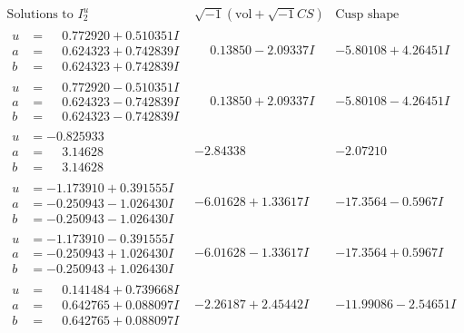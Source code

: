 \documentclass[1p]{elsarticle_modified}
\theoremstyle{definition}
\newcommand{\I}{\sqrt{-1}}
\begin{document}
$$\begin{array}{c|c|c}  
\text{Solutions to }I^u_{2}& \I (\text{vol} + \sqrt{-1}CS) & \text{Cusp shape}\\
 \hline 
\begin{aligned}
u &= \phantom{-}0.772920 + 0.510351 I \\
a &= \phantom{-}0.624323 + 0.742839 I \\
b &= \phantom{-}0.624323 + 0.742839 I\end{aligned}
 & \phantom{-}0.13850 - 2.09337 I & -5.80108 + 4.26451 I \\ \hline\begin{aligned}
u &= \phantom{-}0.772920 - 0.510351 I \\
a &= \phantom{-}0.624323 - 0.742839 I \\
b &= \phantom{-}0.624323 - 0.742839 I\end{aligned}
 & \phantom{-}0.13850 + 2.09337 I & -5.80108 - 4.26451 I \\ \hline\begin{aligned}
u &= -0.825933\phantom{ +0.000000I} \\
a &= \phantom{-}3.14628\phantom{ +0.000000I} \\
b &= \phantom{-}3.14628\phantom{ +0.000000I}\end{aligned}
 & -2.84338\phantom{ +0.000000I} & -2.07210\phantom{ +0.000000I} \\ \hline\begin{aligned}
u &= -1.173910 + 0.391555 I \\
a &= -0.250943 - 1.026430 I \\
b &= -0.250943 - 1.026430 I\end{aligned}
 & -6.01628 + 1.33617 I & -17.3564 - 0.5967 I \\ \hline\begin{aligned}
u &= -1.173910 - 0.391555 I \\
a &= -0.250943 + 1.026430 I \\
b &= -0.250943 + 1.026430 I\end{aligned}
 & -6.01628 - 1.33617 I & -17.3564 + 0.5967 I \\ \hline\begin{aligned}
u &= \phantom{-}0.141484 + 0.739668 I \\
a &= \phantom{-}0.642765 + 0.088097 I \\
b &= \phantom{-}0.642765 + 0.088097 I\end{aligned}
 & -2.26187 + 2.45442 I & -11.99086 - 2.54651 I \\ \hline\begin{aligned}

\end{aligned}
\end{array}$$
\end{document}
